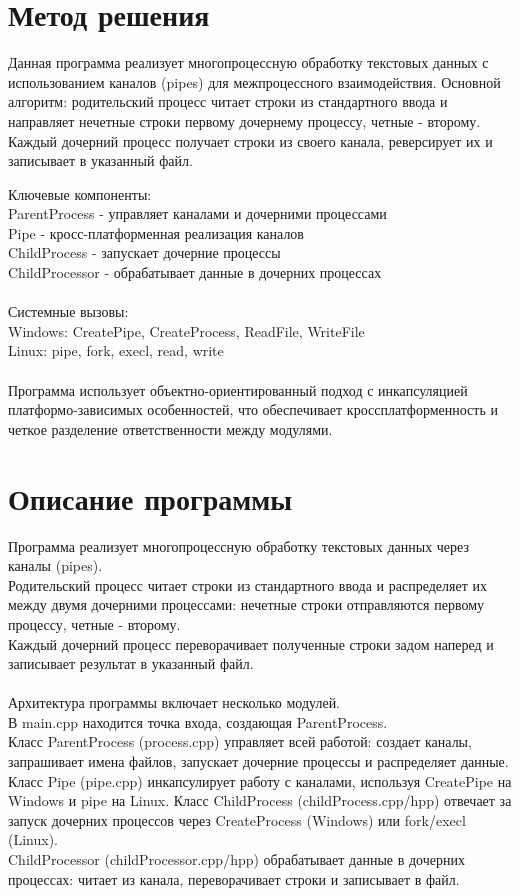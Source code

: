 \section{Метод решения}
Данная программа реализует многопроцессную обработку текстовых данных с использованием каналов (pipes) для межпроцессного взаимодействия.
Основной алгоритм: родительский процесс читает строки из стандартного ввода и направляет нечетные строки первому дочернему процессу, четные - второму. Каждый дочерний процесс получает строки из своего канала, реверсирует их и записывает в указанный файл.

Ключевые компоненты:\\
ParentProcess - управляет каналами и дочерними процессами\\
Pipe - кросс-платформенная реализация каналов\\
ChildProcess - запускает дочерние процессы\\
ChildProcessor - обрабатывает данные в дочерних процессах\\
\\
Системные вызовы:\\
Windows: CreatePipe, CreateProcess, ReadFile, WriteFile\\
Linux: pipe, fork, execl, read, write\\
\\
Программа использует объектно-ориентированный подход с инкапсуляцией платформо-зависимых особенностей, что обеспечивает кроссплатформенность и четкое разделение ответственности между модулями.

\section{Описание программы}
Программа реализует многопроцессную обработку текстовых данных через каналы (pipes). \\
Родительский процесс читает строки из стандартного ввода и распределяет их между двумя дочерними процессами: нечетные строки отправляются первому процессу, четные - второму. \\
Каждый дочерний процесс переворачивает полученные строки задом наперед и записывает результат в указанный файл.\\
\\
Архитектура программы включает несколько модулей. \\
В main.cpp находится точка входа, создающая ParentProcess. \\
Класс ParentProcess (process.cpp) управляет всей работой: создает каналы, запрашивает имена файлов, запускает дочерние процессы и распределяет данные. \\
Класс Pipe (pipe.cpp) инкапсулирует работу с каналами, используя CreatePipe на Windows и pipe на Linux. Класс ChildProcess (childProcess.cpp/hpp) отвечает за запуск дочерних процессов через CreateProcess (Windows) или fork/execl (Linux). \\
ChildProcessor (childProcessor.cpp/hpp) обрабатывает данные в дочерних процессах: читает из канала, переворачивает строки и записывает в файл.\\
